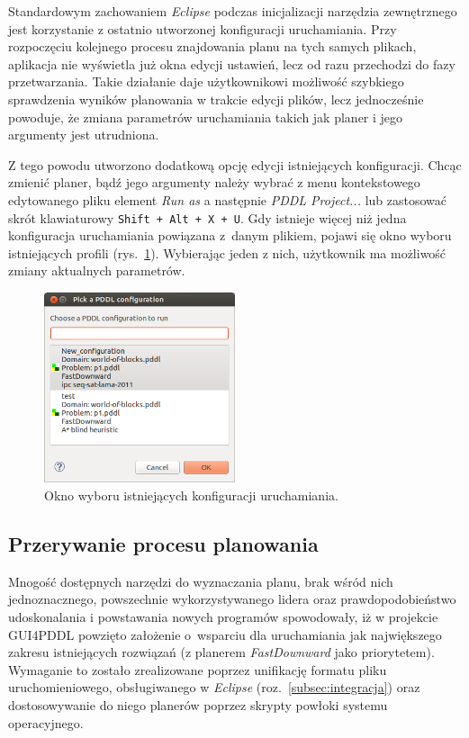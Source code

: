Standardowym zachowaniem \emph{Eclipse} podczas inicjalizacji narzędzia zewnętrznego jest korzystanie z ostatnio utworzonej konfiguracji uruchamiania. Przy rozpoczęciu kolejnego procesu znajdowania planu na tych samych plikach, aplikacja nie wyświetla już okna edycji ustawień, lecz od razu przechodzi do fazy przetwarzania. Takie działanie daje użytkownikowi możliwość szybkiego sprawdzenia wyników planowania w trakcie edycji plików, lecz jednocześnie powoduje, że zmiana parametrów uruchamiania takich jak planer i jego argumenty jest utrudniona.

Z tego powodu utworzono dodatkową opcję edycji istniejących konfiguracji. Chcąc zmienić planer, bądź jego argumenty należy wybrać z menu kontekstowego edytowanego pliku element \emph{Run as} a następnie \emph{PDDL Project...} lub zastosować skrót klawiaturowy \texttt{Shift~+~Alt~+~X~+~U}. Gdy istnieje więcej niż jedna konfiguracja uruchamiania powiązana z~danym plikiem, pojawi się okno wyboru istniejących profili (rys.~\ref{fig:run_configuration_choice}). Wybierając jeden z nich, użytkownik ma możliwość zmiany aktualnych parametrów.

\begin{figure}[h!]
    \centering
    \includegraphics[width=0.5\textwidth]{img/run_configuration_choice}
    \caption{Okno wyboru istniejących konfiguracji uruchamiania.}
    \label{fig:run_configuration_choice}
\end{figure}

\subsection{Przerywanie procesu planowania}
\label{subsec:przerywanie}
Mnogość dostępnych narzędzi do wyznaczania planu, brak wśród nich jednoznacznego, powszechnie wykorzystywanego lidera oraz prawdopodobieństwo udoskonalania i powstawania nowych programów spowodowały, iż w projekcie GUI4PDDL powzięto założenie o~wsparciu dla uruchamiania jak największego zakresu istniejących rozwiązań (z planerem \emph{FastDownward} jako priorytetem). Wymaganie to zostało zrealizowane poprzez unifikację formatu pliku uruchomieniowego, obsługiwanego w \emph{Eclipse} (roz.~\ref{subsec:integracja}) oraz dostosowywanie do niego planerów poprzez skrypty powłoki systemu operacyjnego.

